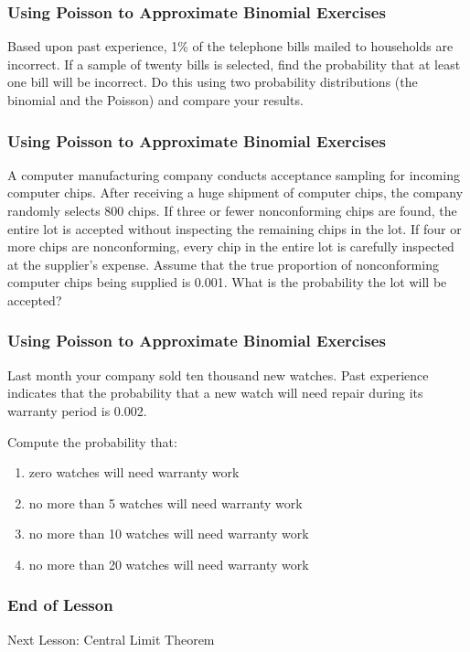 \documentclass[xcolor=dvipsnames]{beamer}
\begin{document}
\begin{frame}
  \frametitle{Using Poisson to Approximate Binomial Exercises}
  {\ubung} Based upon past experience, 1\% of the telephone bills
  mailed to households are incorrect. If a sample of twenty bills is
  selected, find the probability that at least one bill will be
  incorrect. Do this using two probability distributions (the binomial
  and the Poisson) and compare your results.
\end{frame}

\begin{frame}
  \frametitle{Using Poisson to Approximate Binomial Exercises}
  {\ubung} A computer manufacturing company conducts acceptance
  sampling for incoming computer chips. After receiving a huge
  shipment of computer chips, the company randomly selects 800 chips.
  If three or fewer nonconforming chips are found, the entire lot is
  accepted without inspecting the remaining chips in the lot. If four
  or more chips are nonconforming, every chip in the entire lot is
  carefully inspected at the supplier's expense. Assume that the true
  proportion of nonconforming computer chips being supplied is 0.001.
  What is the probability the lot will be accepted?
\end{frame}

\begin{frame}
  \frametitle{Using Poisson to Approximate Binomial Exercises}
  {\ubung} Last month your company sold ten thousand new watches. Past
experience indicates that the probability that a new watch
will  need  repair  during  its  warranty  period  is  0.002.

Compute the probability that:
\begin{enumerate}
\item zero watches will need warranty work
\item no more than 5 watches will need warranty work
\item no more than 10 watches will need warranty work
\item no more than 20 watches will need warranty work
\end{enumerate}
\end{frame}

\begin{frame}
  \frametitle{End of Lesson}
Next Lesson: Central Limit Theorem
\end{frame}
\end{document}
